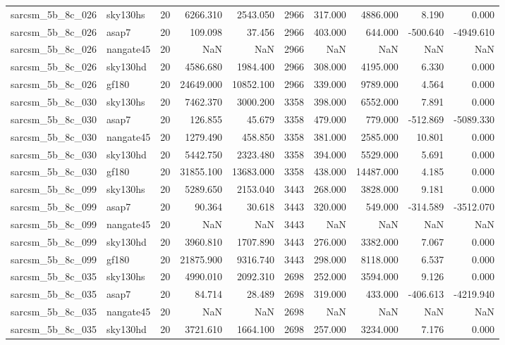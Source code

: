 \documentclass{article}
\begin{document}
\begin{longtable}{llrrrrrrrr}
sarcsm\_5b\_8c\_026 & sky130hs & 20 & 6266.310 & 2543.050 & 2966 & 317.000 & 4886.000 & 8.190 & 0.000 \\
sarcsm\_5b\_8c\_026 & asap7 & 20 & 109.098 & 37.456 & 2966 & 403.000 & 644.000 & -500.640 & -4949.610 \\
sarcsm\_5b\_8c\_026 & nangate45 & 20 & NaN & NaN & 2966 & NaN & NaN & NaN & NaN \\
sarcsm\_5b\_8c\_026 & sky130hd & 20 & 4586.680 & 1984.400 & 2966 & 308.000 & 4195.000 & 6.330 & 0.000 \\
sarcsm\_5b\_8c\_026 & gf180 & 20 & 24649.000 & 10852.100 & 2966 & 339.000 & 9789.000 & 4.564 & 0.000 \\
sarcsm\_5b\_8c\_030 & sky130hs & 20 & 7462.370 & 3000.200 & 3358 & 398.000 & 6552.000 & 7.891 & 0.000 \\
sarcsm\_5b\_8c\_030 & asap7 & 20 & 126.855 & 45.679 & 3358 & 479.000 & 779.000 & -512.869 & -5089.330 \\
sarcsm\_5b\_8c\_030 & nangate45 & 20 & 1279.490 & 458.850 & 3358 & 381.000 & 2585.000 & 10.801 & 0.000 \\
sarcsm\_5b\_8c\_030 & sky130hd & 20 & 5442.750 & 2323.480 & 3358 & 394.000 & 5529.000 & 5.691 & 0.000 \\
sarcsm\_5b\_8c\_030 & gf180 & 20 & 31855.100 & 13683.000 & 3358 & 438.000 & 14487.000 & 4.185 & 0.000 \\
sarcsm\_5b\_8c\_099 & sky130hs & 20 & 5289.650 & 2153.040 & 3443 & 268.000 & 3828.000 & 9.181 & 0.000 \\
sarcsm\_5b\_8c\_099 & asap7 & 20 & 90.364 & 30.618 & 3443 & 320.000 & 549.000 & -314.589 & -3512.070 \\
sarcsm\_5b\_8c\_099 & nangate45 & 20 & NaN & NaN & 3443 & NaN & NaN & NaN & NaN \\
sarcsm\_5b\_8c\_099 & sky130hd & 20 & 3960.810 & 1707.890 & 3443 & 276.000 & 3382.000 & 7.067 & 0.000 \\
sarcsm\_5b\_8c\_099 & gf180 & 20 & 21875.900 & 9316.740 & 3443 & 298.000 & 8118.000 & 6.537 & 0.000 \\
sarcsm\_5b\_8c\_035 & sky130hs & 20 & 4990.010 & 2092.310 & 2698 & 252.000 & 3594.000 & 9.126 & 0.000 \\
sarcsm\_5b\_8c\_035 & asap7 & 20 & 84.714 & 28.489 & 2698 & 319.000 & 433.000 & -406.613 & -4219.940 \\
sarcsm\_5b\_8c\_035 & nangate45 & 20 & NaN & NaN & 2698 & NaN & NaN & NaN & NaN \\
sarcsm\_5b\_8c\_035 & sky130hd & 20 & 3721.610 & 1664.100 & 2698 & 257.000 & 3234.000 & 7.176 & 0.000 \\

\end{longtable}
\end{document}
